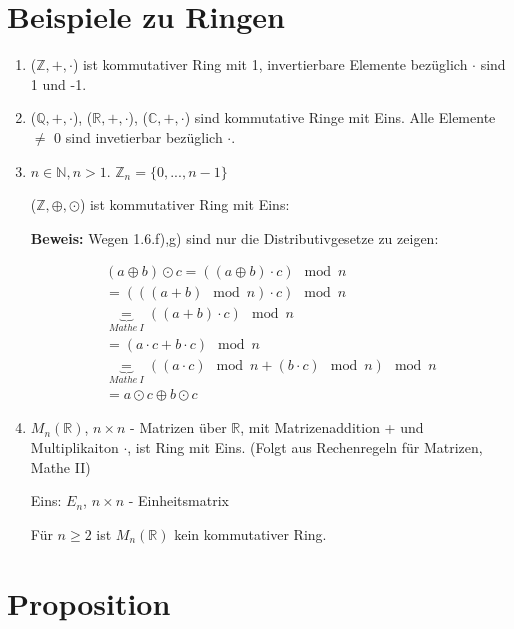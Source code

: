 \documentclass[a4paper, openany]{book}
\begin{document}
  \section{Beispiele zu Ringen}

  \begin{enumerate}[label=(\alph*)]
    \item ($\mathbb{Z},+, \cdot$) ist kommutativer Ring mit 1, invertierbare Elemente bezüglich $\cdot$ sind 1 und -1.
    \item ($\mathbb{Q},+, \cdot$), ($\mathbb{R}, +, \cdot$), ($\mathbb{C}, +, \cdot$) sind kommutative Ringe mit Eins. Alle Elemente $\neq$ 0 sind invetierbar bezüglich $\cdot$.
    \item $n \in \mathbb{N}, n > 1$. $\mathbb{Z}_n = \{0, ..., n-1\}$

    ($\mathbb{Z}, \oplus, \odot$) ist kommutativer Ring mit Eins: 

    \textbf{Beweis:} Wegen 1.6.f),g) sind nur die Distributivgesetze zu zeigen:

    \begin{equation}
      \begin{split}
        (a \oplus b) \odot c = ((a \oplus b) \cdot c) \mod n \\
        = (((a+b) \mod n) \cdot c) \mod n \\
        \underbrace{=}_{Mathe \ I} ((a+b) \cdot c) \mod n \\
        = (a \cdot c + b \cdot c) \mod n \\
        \underbrace{=}_{Mathe \ I} ((a \cdot c) \mod n + (b \cdot c) \mod n) \mod n \\
        = a \odot c \oplus b \odot c
      \end{split}
    \end{equation}

    \item $M_n(\mathbb{R})$, $n \times n$ - Matrizen über $\mathbb{R}$, mit Matrizenaddition + und Multiplikaiton $\cdot$, ist Ring mit Eins. (Folgt aus Rechenregeln für Matrizen, Mathe II)

    Eins: $E_n$, $n \times n$ - Einheitsmatrix

    Für $n \geq 2$ ist $M_n(\mathbb{R})$ kein kommutativer Ring.
  \end{enumerate}

  \section{Proposition}
\end{document}

